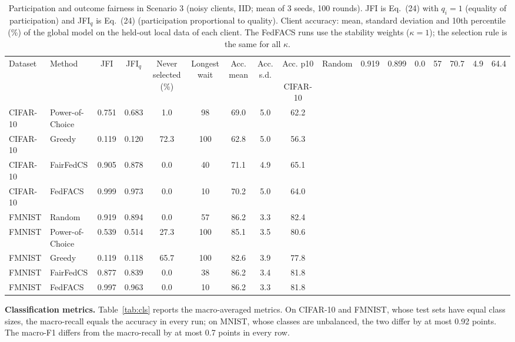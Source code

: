 \begin{table}[!htbp]
\centering
\footnotesize
\setlength{\tabcolsep}{2.5pt}
\renewcommand{\arraystretch}{1.08}
\caption{Participation and outcome fairness in Scenario 3 (noisy clients, IID; mean of 3 seeds, 100 rounds). JFI is Eq.~(24) with $q_i=1$ (equality of participation) and JFI$_q$ is Eq.~(24) (participation proportional to quality). Client accuracy: mean, standard deviation and 10th percentile (\%) of the global model on the held-out local data of each client. The FedFACS runs use the stability weights ($\kappa=1$); the selection rule is the same for all $\kappa$.}
\label{tab:fairness}
\begin{tabular*}{\journalfloatwidth}{@{\extracolsep{\fill}}llccccccc@{}}
\toprule
Dataset & Method & JFI & JFI$_q$ & Never selected (\%) & Longest wait & Acc. mean & Acc. s.d. & Acc. p10 \
\midrule
CIFAR-10 & Random & 0.919 & 0.899 & 0.0 & 57 & 70.7 & 4.9 & 64.4 \\
CIFAR-10 & Power-of-Choice & 0.751 & 0.683 & 1.0 & 98 & 69.0 & 5.0 & 62.2 \\
CIFAR-10 & Greedy & 0.119 & 0.120 & 72.3 & 100 & 62.8 & 5.0 & 56.3 \\
CIFAR-10 & FairFedCS & 0.905 & 0.878 & 0.0 & 40 & 71.1 & 4.9 & 65.1 \\
CIFAR-10 & FedFACS & 0.999 & 0.973 & 0.0 & 10 & 70.2 & 5.0 & 64.0 \\
\addlinespace
FMNIST & Random & 0.919 & 0.894 & 0.0 & 57 & 86.2 & 3.3 & 82.4 \\
FMNIST & Power-of-Choice & 0.539 & 0.514 & 27.3 & 100 & 85.1 & 3.5 & 80.6 \\
FMNIST & Greedy & 0.119 & 0.118 & 65.7 & 100 & 82.6 & 3.9 & 77.8 \\
FMNIST & FairFedCS & 0.877 & 0.839 & 0.0 & 38 & 86.2 & 3.4 & 81.8 \\
FMNIST & FedFACS & 0.997 & 0.963 & 0.0 & 10 & 86.2 & 3.3 & 81.8 \\
\bottomrule
\end{tabular*}
\end{table}

\textbf{Classification metrics.} Table~\ref{tab:cls} reports the macro-averaged metrics. On CIFAR-10 and FMNIST, whose test sets have equal class sizes, the macro-recall equals the accuracy in every run; on MNIST, whose classes are unbalanced, the two differ by at most 0.92 points. The macro-F1 differs from the macro-recall by at most 0.7 points in every row.

